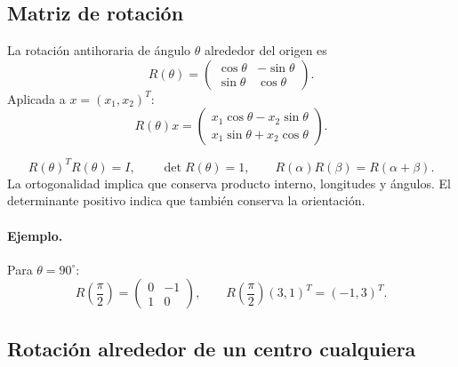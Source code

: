 \subsection{Matriz de rotación}

La rotación antihoraria de ángulo \(\theta\) alrededor del origen es
\[
  R(\theta)=
  \begin{pmatrix}
    \cos\theta&-\sin\theta\\
    \sin\theta& \cos\theta
  \end{pmatrix}.
\]
Aplicada a \(x=(x_1,x_2)^T\):
\[
  R(\theta)x=
  \begin{pmatrix}
    x_1\cos\theta-x_2\sin\theta\\
    x_1\sin\theta+x_2\cos\theta
  \end{pmatrix}.
\]

\begin{center}
\end{center}

\begin{resultado}[Propiedades]
\[
R(\theta)^TR(\theta)=I,\qquad
\det R(\theta)=1,\qquad
R(\alpha)R(\beta)=R(\alpha+\beta).
\]
La ortogonalidad implica que conserva producto interno, longitudes y ángulos. El determinante
positivo indica que también conserva la orientación.
\end{resultado}

\paragraph{Ejemplo.}
Para \(\theta=90^\circ\):
\[
R\left(\frac{\pi}{2}\right)=
\begin{pmatrix}0&-1\\1&0\end{pmatrix},
\qquad
R\left(\frac{\pi}{2}\right)(3,1)^T=(-1,3)^T.
\]

\subsection{Rotación alrededor de un centro cualquiera}

